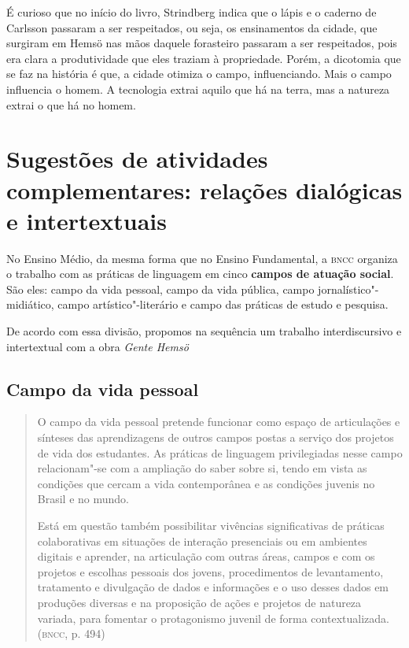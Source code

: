 \documentclass[12pt]{extarticle}
\begin{document}


É curioso que no início do livro, Strindberg indica que o lápis e o
caderno de Carlsson passaram a ser respeitados, ou seja, os ensinamentos
da cidade, que surgiram em Hemsö nas mãos daquele forasteiro passaram a
ser respeitados, pois era clara a produtividade que eles traziam à
propriedade. Porém, a dicotomia que se faz na história é que, a cidade
otimiza o campo, influenciando. Mais o campo influencia o homem. A
tecnologia extrai aquilo que há na terra, mas a natureza extrai o que há
no homem.




\section{Sugestões de atividades complementares: relações dialógicas e
intertextuais}


No Ensino Médio, da mesma forma que no Ensino Fundamental, a \textsc{bncc}
organiza o trabalho com as práticas de linguagem em cinco \textbf{campos
de atuação social}. São eles: campo da vida pessoal, campo da vida
pública, campo jornalístico"-midiático, campo artístico"-literário e campo
das práticas de estudo e pesquisa.

De acordo com essa divisão, propomos na sequência um trabalho
interdiscursivo e intertextual com a obra \emph{Gente Hemsö}

\subsection{Campo da vida pessoal}

\begin{quote}
O campo da vida pessoal pretende funcionar como espaço de articulações
e sínteses das aprendizagens de outros campos postas a serviço dos
projetos de vida dos estudantes. As práticas de linguagem privilegiadas
nesse campo relacionam"-se com a ampliação do saber sobre si, tendo em
vista as condições que cercam a vida contemporânea e as condições
juvenis no Brasil e no mundo.

Está em questão também possibilitar vivências significativas de práticas
colaborativas em situações de interação presenciais ou em ambientes
digitais e aprender, na articulação com outras áreas, campos e com os
projetos e escolhas pessoais dos jovens, procedimentos de levantamento,
tratamento e divulgação de dados e informações e o uso desses dados em
produções diversas e na proposição de ações e projetos de natureza
variada, para fomentar o protagonismo juvenil de forma
contextualizada. (\textsc{bncc}, p. 494)
\end{quote}
\end{document}
